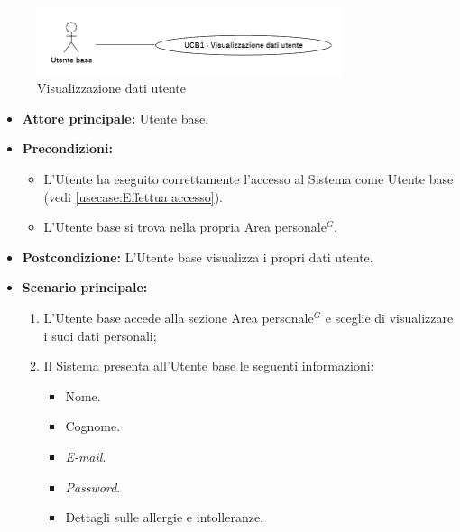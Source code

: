 \label{usecase:Visualizzazione dati utente}

\begin{figure}[h]
	\centering
	\includegraphics[width=0.8\textwidth]{./uml/UCB1.png} 
	\caption{Visualizzazione dati utente}
	\label{fig:UCB1}
  \end{figure}


\begin{itemize}
	\item \textbf{Attore principale:} Utente base.

	\item \textbf{Precondizioni:}
	      \begin{itemize}
		      \item L'Utente ha eseguito correttamente l'accesso al Sistema come
		            Utente base (vedi \autoref{usecase:Effettua accesso}).
		      \item L'Utente base si trova nella propria Area personale$^G$.
	      \end{itemize}

	\item \textbf{Postcondizione:} L'Utente base visualizza i propri dati utente.

	\item \textbf{Scenario principale:}
	      \begin{enumerate}
		      \item L'Utente base accede alla sezione Area personale$^G$ e sceglie di visualizzare i suoi dati personali;
		      \item Il Sistema presenta all'Utente base le seguenti informazioni:
		            \begin{itemize}
			            \item Nome.
			            \item Cognome.
			            \item \textit{E-mail}.
			            \item \textit{Password}.
			            \item Dettagli sulle allergie e intolleranze.
		            \end{itemize}
	      \end{enumerate}
\end{itemize}
